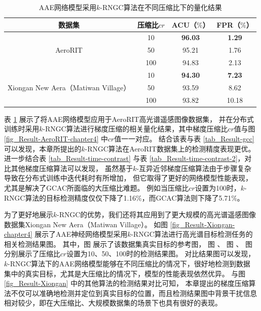 \documentclass{xdupgthesis}
\begin{document}
\renewcommand{\arraystretch}{1.3}
\begin{table}[ht]
    \centering
    \begin{threeparttable}
        \caption{AAE网络模型采用$k$-RNGC算法在不同压缩比下的量化结果}
        \label{tab_Result-k-RNGC-AeroRIT-Xiongan}
        \begin{tabular}{c|c|c|c}
            \toprule
            \toprule
            数据集 & 压缩比$cr$ & ACU（$\%$） & FPR（$\%$） \\
            \midrule
            \multirow{3}{*}{AeroRIT} & 10 & \textbf{96.03} & \textbf{1.29} \\
                                    & 50 & 95.21 & 1.76 \\
                                    & 100 & 94.83 & 2.13 \\
            \midrule
            \multirow{3}{*}{Xiongan New Aera（Matiwan Village）} & 10 & \textbf{94.30} & \textbf{7.23} \\
                                                & 50 & 93.59 & 8.62 \\
                                                & 100 & 93.82 & 10.18 \\
            \bottomrule
            \bottomrule
        \end{tabular}
    \end{threeparttable}
\end{table}

表 \ref{tab_Result-k-RNGC-AeroRIT-Xiongan} 展示了将AAE网络模型应用于AeroRIT高光谱遥感图像数据集，
并在分布式训练时采用$k$-RNGC算法进行梯度压缩的相关量化结果，其中梯度压缩比$cr$值与图 \ref*{fig_Result-AeroRIT-chapter4} 中$cr$值一一对应。
结合该表与表 \ref*{tab_Result-gcc} 可以发现，本章所提出的$k$-RNGC算法在AeroRIT数据集上的检测精度表现更优。
进一步结合表 \ref*{tab_Result-time-contrast} 与表 \ref*{tab_Result-time-contrast-2}，对比其他梯度压缩算法可以发现，
虽然基于$k$-互异近邻梯度压缩算法由于步骤复杂导致在分布式训练中迭代耗时有所增加，
但它取得了更好的网络模型性能表现，尤其是解决了GCAC所面临的大压缩比难题。
例如当压缩比$cr$设置为100时，$k$-RNGC算法的目标检测精度仅仅下降了1.16$\%$，而GCAC算法则下降了5.71$\%$。

为了更好地展示$k$-RNGC的优势，我们还将其应用到了更大规模的高光谱遥感图像数据集Xiongan New Aera（Matiwan Village）。
如图 \ref*{fig_Result-Xiongan-chapter4} 展示了AAE神经网络模型采用$k$-RNGC算法进行高光谱目标检测任务的相关检测结果图。
其中，图  展示了该数据集真实目标的参考图，
图  、
图  、
图  
分别展示了压缩比$cr$设置为10、50、100时的检测结果图。
对比结果图可以发现，$k$-RNGC算法下的AAE网络模型能够在不同压缩比的情况下，很好地检测到数据集中的真实目标，尤其是大压缩比的情况下，模型的性能表现依然优异。
与图 \ref*{fig_Result-Xiongan} 中的其他算法的检测结果对比可知，
本章提出的梯度压缩算法不仅可以准确地检测并定位到真实目标的位置，而且检测结果图中背景干扰信息相对较少，即在大压缩比、大规模数据集的场景下也具有很好的表现。
\end{document}
